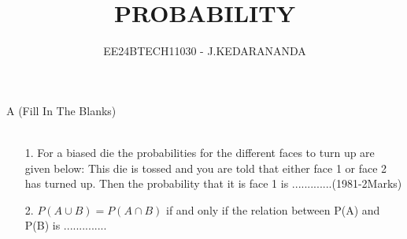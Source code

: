 \documentclass[journal,12pt,twocolumn]{IEEEtran}
\theoremstyle{remark}
\begin{document}

\vspace{3cm}

\title{PROBABILITY}
\author{EE24BTECH11030 - J.KEDARANANDA}
\maketitle
\newpage
\bigskip

\renewcommand{\thefigure}{\theenumi}
\renewcommand{\thetable}{\theenumi}
A  (Fill In The Blanks)\\\\
\begin{enumerate}
    \item[1.] For a biased die the probabilities for the different faces to turn up are given below:
    \bigskip
    This die is tossed and you are told that either face 1 or face 2 has turned up. Then the probability that it is face 1 is .............\hfill{(1981-2Marks)}\\
    \item[2.] $P(A \cup B)=P(A \cap B)$ if and only if the relation between P(A) and P(B) is .............. 
    

\end{enumerate}
\end{document}

